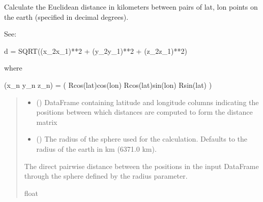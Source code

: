 \documentclass[letterpaper,10pt,english]{sphinxmanual}
\begin{document}
\begin{fulllineitems}
\label{\detokenize{misc:glomar_gridding.distances.euclidean_distance}}
\pysigstartsignatures
\pysiglinewithargsret
{}
{\sphinxparamcomma {}}
{}
\pysigstopsignatures
\sphinxAtStartPar
Calculate the Euclidean distance in kilometers between pairs of lat, lon
points on the earth (specified in decimal degrees).

\sphinxAtStartPar
See:

\sphinxAtStartPar
d = SQRT((x\_2\sphinxhyphen{}x\_1)**2 + (y\_2\sphinxhyphen{}y\_1)**2 + (z\_2\sphinxhyphen{}z\_1)**2)

\sphinxAtStartPar
where

\sphinxAtStartPar
(x\_n y\_n z\_n) = ( Rcos(lat)cos(lon) Rcos(lat)sin(lon) Rsin(lat) )
\begin{quote}\begin{description}
\begin{itemize}
\item {}
\sphinxAtStartPar
{} () \textendash{} DataFrame containing latitude and longitude columns indicating the
positions between which distances are computed to form the distance
matrix

\item {}
\sphinxAtStartPar
{} () \textendash{} The radius of the sphere used for the calculation. Defaults to the
radius of the earth in km (6371.0 km).

\end{itemize}

\sphinxAtStartPar
{} \textendash{} The direct pairwise distance between the positions in the input
DataFrame through the sphere defined by the radius parameter.

\sphinxAtStartPar
float

\end{description}\end{quote}

\end{fulllineitems}
\end{document}

